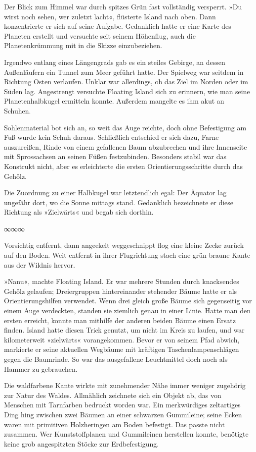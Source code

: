 Der Blick zum Himmel war durch spitzes Grün fast vollständig versperrt. »Du wirst noch sehen, wer zuletzt lacht«, flüsterte Island nach oben. Dann konzentrierte er sich auf seine Aufgabe. Gedanklich hatte er eine Karte des Planeten erstellt und versuchte seit seinem Höhenflug, auch die Planetenkrümmung mit in die Skizze einzubeziehen.

Irgendwo entlang eines Längengrads gab es ein steiles Gebirge, an dessen Außenläufern ein Tunnel zum Meer geführt hatte. Der Spielweg war seitdem in Richtung Osten verlaufen. Unklar war allerdings, ob das Ziel im Norden oder im Süden lag. Angestrengt versuchte Floating Island sich zu erinnern, wie man seine Planetenhalbkugel ermitteln konnte. Außerdem mangelte es ihm akut an Schuhen.

Sohlenmaterial bot sich an, so weit das Auge reichte, doch ohne Befestigung am Fuß wurde kein Schuh daraus. Schließlich entschied er sich dazu, Farne auszureißen, Rinde von einem gefallenen Baum abzubrechen und ihre Innenseite mit Sprossachsen an seinen Füßen festzubinden. Besonders stabil war das Konstrukt nicht, aber es erleichterte die ersten Orientierungsschritte durch das Gehölz.

Die Zuordnung zu einer Halbkugel war letztendlich egal: Der Äquator lag ungefähr dort, wo die Sonne mittags stand. Gedanklich bezeichnete er diese Richtung als »Zielwärts« und begab sich dorthin.

\begin{center}
	∞∞∞
\end{center}

Vorsichtig entfernt, dann angeekelt weggeschnippt flog eine kleine Zecke zurück auf den Boden. Weit entfernt in ihrer Flugrichtung stach eine grün-braune Kante aus der Wildnis hervor.

»Nanu«, machte Floating Island. Er war mehrere Stunden durch knacksendes Gehölz gelaufen; Dreiergruppen hintereinander stehender Bäume hatte er als Orientierungshilfen verwendet. Wenn drei gleich große Bäume sich gegenseitig vor einem Auge verdeckten, standen sie ziemlich genau in einer Linie. Hatte man den ersten erreicht, konnte man mithilfe der anderen beiden Bäume einen Ersatz finden. Island hatte diesen Trick genutzt, um nicht im Kreis zu laufen, und war kilometerweit »zielwärts« vorangekommen. Bevor er von seinem Pfad abwich, markierte er seine aktuellen Wegbäume mit kräftigen Taschenlampenschlägen gegen die Baumrinde. So war das ausgefallene Leuchtmittel doch noch als Hammer zu gebrauchen.

Die waldfarbene Kante wirkte mit zunehmender Nähe immer weniger zugehörig zur Natur des Waldes. Allmählich zeichnete sich ein Objekt ab, das von Menschen mit Tarnfarben bedruckt worden war. Ein merkwürdiges zeltartiges Ding hing zwischen zwei Bäumen an einer schwarzen Gummileine; seine Ecken waren mit primitiven Holzheringen am Boden befestigt. Das passte nicht zusammen. Wer Kunststoffplanen und Gummileinen herstellen konnte, benötigte keine grob angespitzten Stöcke zur Erdbefestigung.

